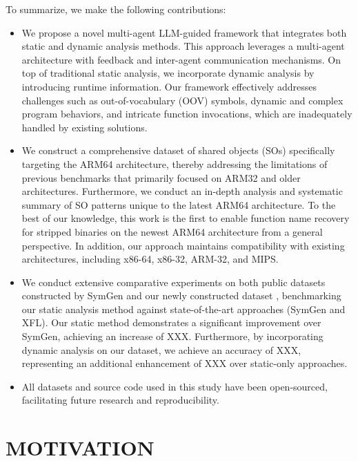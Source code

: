 \documentclass[acmsmall,screen,review,anonymous]{acmart} %
\begin{document}
To summarize, we make the following contributions:

\begin{itemize}
    \item We propose a novel multi-agent LLM-guided framework that integrates both static and dynamic analysis methods. This approach leverages a multi-agent architecture with feedback and inter-agent communication mechanisms. On top of traditional static analysis, we incorporate dynamic analysis by introducing runtime information. Our framework effectively addresses challenges such as out-of-vocabulary (OOV) symbols, dynamic and complex program behaviors, and intricate function invocations, which are inadequately handled by existing solutions.
    \item We construct a comprehensive dataset of shared objects (SOs) specifically targeting the ARM64 architecture, thereby addressing the limitations of previous benchmarks that primarily focused on ARM32 and older architectures. Furthermore, we conduct an in-depth analysis and systematic summary of SO patterns unique to the latest ARM64 architecture. To the best of our knowledge, this work is the first to enable function name recovery for stripped binaries on the newest ARM64 architecture from a general perspective. In addition, our approach maintains compatibility with existing architectures, including x86-64, x86-32, ARM-32, and MIPS.
    \item We conduct extensive comparative experiments on both public datasets constructed by SymGen and our newly constructed dataset , benchmarking our static analysis method against state-of-the-art approaches (SymGen and XFL). Our static method demonstrates a significant improvement over SymGen, achieving an increase of XXX. Furthermore, by incorporating dynamic analysis on our dataset, we achieve an accuracy of XXX, representing an additional enhancement of XXX over static-only approaches.
    \item All datasets and source code used in this study have been open-sourced, facilitating future research and reproducibility.
\end{itemize}

\section{MOTIVATION}

\end{document}
